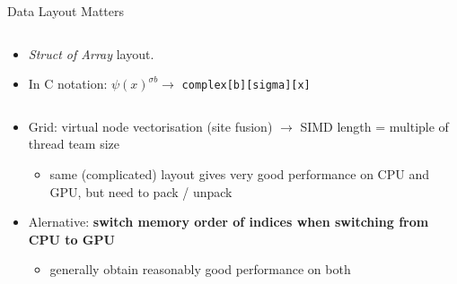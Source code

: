 \begin{frame}{Data Layout Matters}
\begin{columns}
\begin{itemize}
\begin{itemize}
          \item \emph{Struct of Array} layout.
          \vspace{0.3cm}
          \item In C notation: $\psi(x)^{\sigma b} \rightarrow$ \texttt{complex[b][sigma][x]}
        \end{itemize}
      \end{itemize}
  \end{columns}
  \vspace{0.4cm}
  \begin{itemize}
    \item<5-> Grid: virtual node vectorisation (site fusion) $\rightarrow$ SIMD length = multiple of thread team size
    \begin{itemize}
      \item same (complicated) layout gives very good performance on CPU and GPU, but need to pack / unpack
    \end{itemize}
    \vspace{0.4cm}
    \item<6-> Alernative: \textbf{switch memory order of indices when switching from CPU to GPU}
    \begin{itemize}
      \item generally obtain reasonably good performance on both 
    \end{itemize}
  \end{itemize}
\end{frame}

